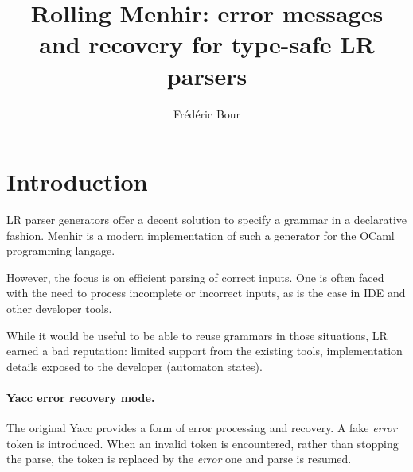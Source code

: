 \documentclass[twoside,a4paper]{article}
\title{Rolling Menhir: error messages and recovery for type-safe LR parsers}
\author{Fr{\'e}d{\'e}ric Bour}%
\affiliation{}
\begin{document}
\setcounter{page}{1}
\maketitle

%
%

\section{Introduction}


LR parser generators offer a decent solution to specify a grammar in a
declarative fashion.  Menhir is a modern implementation of such a generator for
the OCaml programming langage.


However, the focus is on efficient parsing of correct inputs.  One is often
faced with the need to process incomplete or incorrect inputs, as is the case
in IDE and other developer tools.


While it would be useful to be able to reuse grammars in those situations, LR
earned a bad reputation: limited support from the existing tools,
implementation details exposed to the developer (automaton states).


\paragraph{Yacc error recovery mode.}
The original Yacc provides a form of error processing and recovery. A fake {\em
error} token is introduced. When an invalid token is encountered, rather than
stopping the parse, the token is replaced by the {\em error} one and parse is
resumed.
\end{document}

